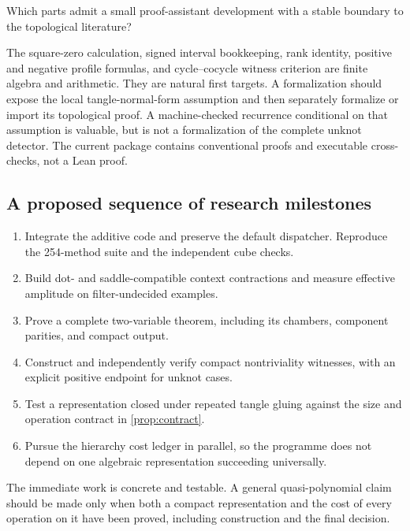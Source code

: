 \begin{question}\label{q:formal}
Which parts admit a small proof-assistant development with a stable
boundary to the topological literature?
\end{question}

The square-zero calculation, signed interval bookkeeping, rank identity,
positive and negative profile formulas, and cycle--cocycle witness
criterion are finite algebra and arithmetic. They are natural first
targets. A formalization should expose the local tangle-normal-form
assumption and then separately formalize or import its topological
proof. A machine-checked recurrence conditional on that assumption is
valuable, but is not a formalization of the complete unknot detector.
The current package contains conventional proofs and executable
cross-checks, not a Lean proof.

\subsection{A proposed sequence of research milestones}

\begin{enumerate}
\item Integrate the additive code and preserve the default dispatcher.
Reproduce the 254-method suite and the independent cube checks.
\item Build dot- and saddle-compatible context contractions and measure
effective amplitude on filter-undecided examples.
\item Prove a complete two-variable theorem, including its chambers,
component parities, and compact output.
\item Construct and independently verify compact nontriviality witnesses,
with an explicit positive endpoint for unknot cases.
\item Test a representation closed under repeated tangle gluing against
the size and operation contract in \cref{prop:contract}.
\item Pursue the hierarchy cost ledger in parallel, so the programme
does not depend on one algebraic representation succeeding universally.
\end{enumerate}

The immediate work is concrete and testable. A general quasi-polynomial
claim should be made only when both a compact representation and the
cost of every operation on it have been proved, including construction
and the final decision.
